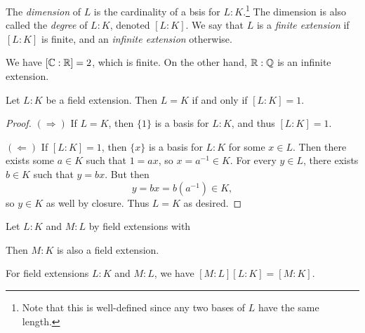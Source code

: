 \begin{definition}
  The \emph{dimension} of $L$
  is the cardinality of a bsis for $L : K$.\footnote{Note that this is well-defined since any two bases of $L$ have the same length.}
  The dimension is also called the \emph{degree} of
  $L : K$, denoted $[L : K]$. We say that $L$ is a
  \emph{finite extension} if $[L : K]$ is finite, and
  an \emph{infinite extension} otherwise.
\end{definition}

\begin{example}
  We have $[\mathbb{C} : \mathbb{R}] = 2$, which is finite. On the
  other hand, $\mathbb{R} : \mathbb{Q}$ is an infinite extension.
\end{example}

\begin{theorem}
  Let $L : K$ be a field extension. Then
  $L = K$ if and only if $[L : K] = 1$.
\end{theorem}

\begin{proof}
  $(\Rightarrow)$ If $L = K$, then $\{1\}$ is a basis
  for $L : K$, and thus $[L : K] = 1$.

  $(\Leftarrow)$ If $[L : K] = 1$, then $\{x\}$ is a
  basis for $L : K$ for some $x \in L$. Then there exists
  some $a \in K$ such that $1 = ax$, so
  $x = a^{-1} \in K$. For every $y \in L$, there exists
  $b \in K$ such that $y = bx$. But then
  \[
    y = bx = b(a^{-1}) \in K,
  \]
  so $y \in K$ as well by closure. Thus $L = K$
  as desired.
\end{proof}

\begin{remark}
Let $L : K$ and $M : L$ by field extensions with
\begin{center}
\end{center}
Then $M : K$ is also a field extension.
\end{remark}

\begin{theorem}
  For field extensions $L : K$ and $M : L$, we have
  $[M : L][L : K] = [M : K]$.
\end{theorem}

